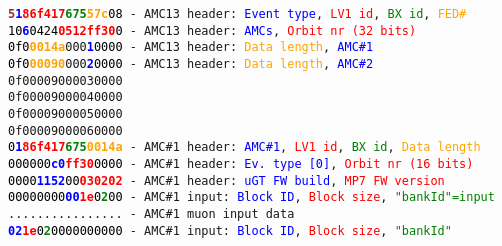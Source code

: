 \texttt{\textcolor{brown}{\textbf{5}}\textcolor{blue}{\textbf{1}}\textcolor{red}{\textbf{86f417}}\textcolor{green}{\textbf{675}}\textcolor{orange}{\textbf{57c}}\textcolor{black}{08} - AMC13 header: \textcolor{blue}{Event type}, \textcolor{red}{LV1 id}, \textcolor{green}{BX id}, \textcolor{orange}{FED\#}}\\
\texttt{\textcolor{black}{10}\textcolor{blue}{\textbf{6}}\textcolor{black}{0424}\textcolor{red}{\textbf{0512ff30}}\textcolor{black}{0} - AMC13 header: \textcolor{blue}{AMCs}, \textcolor{red}{Orbit nr (32 bits)}}\\
\texttt{\textcolor{black}{0f0}\textcolor{orange}{\textbf{0014a}}\texttt{000}\textcolor{blue}{\textbf{1}}\textcolor{black}{0000} - AMC13 header: \textcolor{orange}{Data length}, \textcolor{blue}{AMC\#1}}\\
\texttt{\textcolor{black}{0f0}\textcolor{orange}{\textbf{00090}}\texttt{000}\textcolor{blue}{\textbf{2}}\textcolor{black}{0000} - AMC13 header: \textcolor{orange}{Data length}, \textcolor{blue}{AMC\#2}}\\
\texttt{0f00009000030000}\\
\texttt{0f00009000040000}\\
\texttt{0f00009000050000}\\
\texttt{0f00009000060000}\\
\texttt{\textcolor{black}{0}\textcolor{blue}{\textbf{1}}\textcolor{red}{\textbf{86f417}}\textcolor{green}{\textbf{675}}\textcolor{orange}{\textbf{0014a}} - AMC\#1 header: \textcolor{blue}{AMC\#1}, \textcolor{red}{LV1 id}, \textcolor{green}{BX id}, \textcolor{orange}{Data length}}\\
\texttt{\textcolor{black}{000000}\textcolor{blue}{\textbf{c0}}\textcolor{red}{\textbf{ff30}}\textcolor{black}{0000} - AMC\#1 header: \textcolor{blue}{Ev. type [0]}, \textcolor{red}{Orbit nr (16 bits)}}\\
\texttt{\textcolor{black}{0000}\textcolor{blue}{\textbf{1152}}\textcolor{black}{00}\textcolor{red}{\textbf{030202}} - AMC\#1 header: \textcolor{blue}{uGT FW build}, \textcolor{red}{MP7 FW version}}\\
\texttt{\textcolor{black}{00000000}\textcolor{blue}{\textbf{00}}\textcolor{red}{\textbf{1e}}\textcolor{black}{0}\textcolor{green}{\textbf{2}}\textcolor{black}{00} - AMC\#1 input: \textcolor{blue}{Block ID}, \textcolor{red}{Block size}, \textcolor{green}{"bankId"=input}}\\
\texttt{................ - AMC\#1 muon input data}\\
\texttt{\textcolor{blue}{\textbf{02}}\textcolor{red}{\textbf{1e}}\textcolor{black}{0}\textcolor{green}{\textbf{2}}\textcolor{black}{0000000000} - AMC\#1 input: \textcolor{blue}{Block ID}, \textcolor{red}{Block size}, \textcolor{green}{"bankId"}}\\
